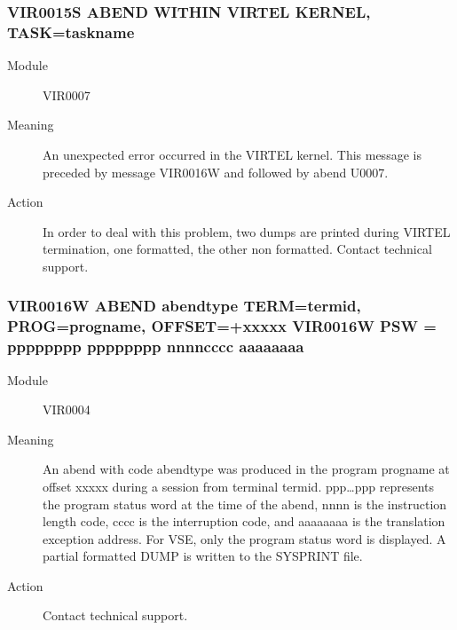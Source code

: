 \documentclass[letterpaper,10pt,english]{sphinxmanual}
\begin{document}
\subsubsection{VIR0015S ABEND WITHIN VIRTEL KERNEL, TASK=taskname}
\label{\detokenize{messages:vir0015s-abend-within-virtel-kernel-task-taskname}}\begin{description}
\item[{Module}] \leavevmode
VIR0007

\item[{Meaning}] \leavevmode
An unexpected error occurred in the VIRTEL kernel. This message is preceded by message VIR0016W and followed by abend U0007.

\item[{Action}] \leavevmode
In order to deal with this problem, two dumps are printed during VIRTEL termination, one formatted, the other non formatted. Contact technical support.

\end{description}


\subsubsection{VIR0016W ABEND abendtype TERM=termid, PROG=progname, OFFSET=+xxxxx VIR0016W PSW = pppppppp pppppppp nnnncccc aaaaaaaa}
\label{\detokenize{messages:vir0016w-abend-abendtype-term-termid-prog-progname-offset-xxxxx-vir0016w-psw-pppppppp-pppppppp-nnnncccc-aaaaaaaa}}\begin{description}
\item[{Module}] \leavevmode
VIR0004

\item[{Meaning}] \leavevmode
An abend with code abendtype was produced in the program progname at offset xxxxx during a session from terminal termid. ppp…ppp represents the program status word at the time of the abend, nnnn is the instruction length code, cccc is the interruption code, and aaaaaaaa is the translation exception address. For VSE, only the program status word is displayed. A partial formatted DUMP is written to the SYSPRINT file.

\item[{Action}] \leavevmode
Contact technical support.

\end{description}
\end{document}

